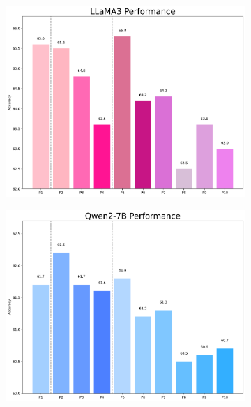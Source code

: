 \documentclass[11pt]{article}
\begin{document}
\begin{figure}[h]
    \centering
   
    \begin{subfigure}[b]{0.3\linewidth}  %
        \centering
        \includegraphics[width=\linewidth]{picture/figure4_llama3.png}
    \end{subfigure}
    \begin{subfigure}[b]{0.3\linewidth}
        \centering
        \includegraphics[width=\linewidth]{picture/figure4_qwen.png}
    \end{subfigure}

\end{figure}
\end{document}
